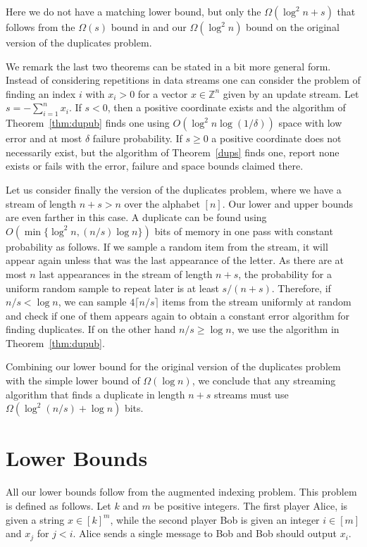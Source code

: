 \documentclass[9pt,letterpaper]{article}
\theoremstyle{remark}
\begin{document}
Here we do not have a matching lower bound, but only the $\Omega(\log^2n+s)$ that
follows from the $\Omega(s)$ bound in \cite{GopalanJaikumar} and our
$\Omega(\log^2 n)$ bound on the original version of the duplicates problem.

We remark the last two theorems can be stated in a bit more general
form. Instead of considering repetitions in data streams one can consider the
problem of finding an index $i$ with $x_i>0$ for a vector
$x\in\mathbb Z^n$ given by an update stream. Let
$s=-\sum_{i=1}^nx_i$. If $s<0$, then a positive coordinate exists and the
algorithm of Theorem~\ref{thm:dupub} finds one using $O(\log^2 n\log(1/\delta))$
space with low error and at most $\delta$ failure probability.
If $s\ge0$ a positive coordinate does not necessarily exist, but the algorithm
of Theorem~\ref{dups} finds one, report none exists or fails with the error,
failure and space bounds claimed there.

Let us consider finally the version of the duplicates problem, where we have a
stream of length $n+s>n$ over the alphabet $[n]$. Our lower and upper bounds
are even farther in this case. A duplicate can be found using $O(\min\{\log^2n,
(n/s)\log n\})$ bits of memory in one pass with constant probability as
follows. If we sample a random item from the stream, it will appear again
unless that was the last appearance of the letter. As there are at most $n$
last appearances in the stream of length $n+s$, the probability for a uniform
random sample to repeat later is at least $s/(n+s)$. Therefore, if $n/s < \log
n$, we can sample $4\lceil n/s\rceil$ items from the stream uniformly at
random and check if one of them appears again to obtain a constant error
algorithm for finding duplicates. If on the other hand $n/s \geq \log n$, we use
the algorithm in Theorem~\ref{thm:dupub}.

Combining our lower bound for the original version of the duplicates problem 
with the simple lower bound of  $\Omega(\log n)$, we conclude that any 
streaming algorithm that finds a duplicate in length $n+s$ streams must use 
$\Omega(\log^2(n/s)+ \log n)$ bits.


%
%
\section{Lower Bounds}\label{sec:lb}
All our lower bounds follow from the augmented indexing problem. This problem
is defined as follows. Let $k$ and $m$ be positive integers.
The first player Alice, is given a string $x\in[k]^m$, while the second player Bob
is given an integer $i\in [m]$ and $x_j$ for $j<i$. Alice sends a single
message to Bob and Bob should output $x_i$. 
\end{document}
